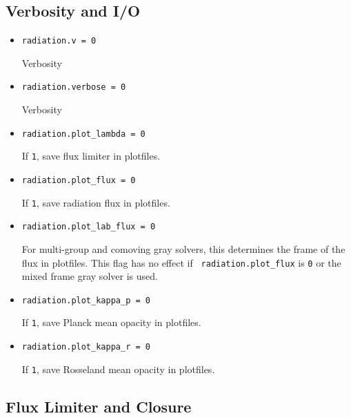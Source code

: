 \documentclass[11pt,letterpaper]{article}
\begin{document}
\subsection{Verbosity and I/O}
\label{sec:bothpar}

\begin{itemize}
\item {\tt radiation.v = 0}
  
  Verbosity

\item {\tt radiation.verbose = 0}
  
  Verbosity

\item {\tt radiation.plot\_lambda = 0}
  
  If {\tt 1}, save flux limiter in plotfiles.

\item {\tt radiation.plot\_flux = 0}
  
  If {\tt 1}, save radiation flux in plotfiles.

\item {\tt radiation.plot\_lab\_flux = 0}

  For multi-group and comoving gray solvers, this determines the frame
  of the flux in plotfiles.  This flag has no effect if {\tt
    radiation.plot\_flux} is {\tt 0} or the mixed frame gray solver is
  used. 

\item {\tt radiation.plot\_kappa\_p = 0}

  If {\tt 1}, save Planck mean opacity in plotfiles.

\item {\tt radiation.plot\_kappa\_r = 0}

  If {\tt 1}, save Rosseland mean opacity in plotfiles.

\end{itemize}


\subsection{Flux Limiter and Closure}

\label{sec:fluxlimiter}
\end{document}

